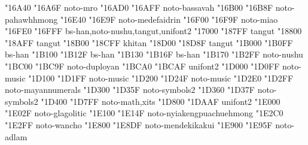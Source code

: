 \documentclass{article}
\begin{document}
                                            { "16A40} { "16A6F} {noto-mro}
                                      { "16AD0} { "16AFF} {noto-bassavah}
                                   { "16B00} { "16B8F} {noto-pahawhhmong}
                                    { "16E40} { "16E9F} {noto-medefaidrin}
                                           { "16F00} { "16F9F} {noto-miao}
            { "16FE0} { "16FFF} {bs-han,noto-nushu,tangut,unifont2}
                                         { "17000} { "187FF} {tangut}
                              { "18800} { "18AFF} {tangut}
                            { "18B00} { "18CFF} {khitan}
                              { "18D00} { "18D8F} {tangut}
                                { "1B000} { "1B0FF} {bs-han}
                                { "1B100} { "1B12F} {bs-han}
                           { "1B130} { "1B16F} {bs-han}
                                          { "1B170} { "1B2FF} {noto-nushu}
                                       { "1BC00} { "1BC9F} {noto-duployan}
                      { "1BCA0} { "1BCAF} {unifont2}
                      { "1D000} { "1D0FF} {noto-music}
                                { "1D100} { "1D1FF} {noto-music}
                 { "1D200} { "1D24F} {noto-music}
                                 { "1D2E0} { "1D2FF} {noto-mayannumerals}
                          { "1D300} { "1D35F} {noto-symbols2}
                          { "1D360} { "1D37F} {noto-symbols2}
              { "1D400} { "1D7FF} {noto-math,xits}
                             { "1D800} { "1DAAF} {unifont2}
                          { "1E000} { "1E02F} {noto-glagolitic}
                         { "1E100} { "1E14F} {noto-nyiakengpuachuehmong}
                                         { "1E2C0} { "1E2FF} {noto-wancho}
                                  { "1E800} { "1E8DF} {noto-mendekikakui}
                                          { "1E900} { "1E95F} {noto-adlam}
\end{document}
